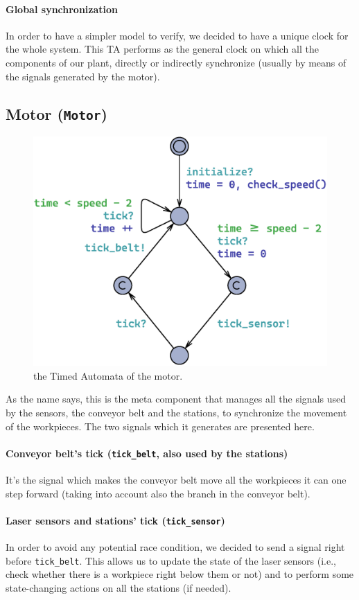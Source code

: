 \documentclass[a4paper]{article}
\begin{document}
    \paragraph{Global synchronization} In order to have a simpler model to verify, we decided to have a unique clock for the whole system. This TA performs as the general clock on which all the components of our plant, directly or indirectly synchronize (usually by means of the signals generated by the motor).

    \subsection{Motor (\texttt{Motor})}

    \begin{figure}[h!]
        \centering
        \includegraphics[width=0.3\columnwidth]{./images/automata/motor}
        \caption{the Timed Automata of the motor.}
    \end{figure}

    As the name says, this is the meta component that manages all the signals used by the sensors, the conveyor belt and the stations, to synchronize the movement of the workpieces. The two signals which it generates are presented here.

    \paragraph{Conveyor belt's tick (\texttt{tick\_belt}, also used by the stations)} It's the signal which makes the conveyor belt move all the workpieces it can one step forward (taking into account also the branch in the conveyor belt).

    \paragraph{Laser sensors and stations' tick (\texttt{tick\_sensor})} In order to avoid any potential race condition, we decided to send a signal right before \texttt{tick\_belt}. This allows us to update the state of the laser sensors (i.e., check whether there is a workpiece right below them or not) and to perform some state-changing actions on all the stations (if needed).
\end{document}
